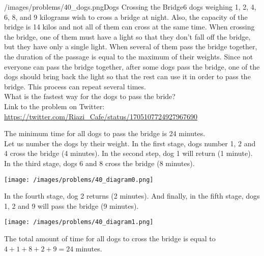 \begin{problem}{/images/problems/40_dogs.png}{Dogs Crossing the Bridge}6 dogs weighing 1, 2, 4, 6, 8, and 9 kilograms wish to cross a bridge at night. Also, the capacity of the bridge is 14 kilos and not all of them can cross at the same time. When crossing the bridge, one of them must have a light so that they don't fall off the bridge, but they have only a single light. When several of them pass the bridge together, the duration of the passage is equal to the maximum of their weights. Since not everyone can pass the bridge together, after some  dogs pass the bridge, one of the dogs should bring back the light so that the rest can use it in order to pass the bridge. This process can repeat several times.\\[0.2cm]

What is the fastest way for the dogs to pass the bride?\\[0.2cm]

Link to the problem on Twitter:  \url{https://twitter.com/Riazi_Cafe/status/1705107724927967690}\end{problem}
\begin{solution}
The minimum time  for all dogs to pass the bridge is 24 minutes.\\[0.2cm]

Let us number the dogs by their weight. In the first stage, dogs number 1, 2 and 4 cross the bridge (4 minutes). In the second step, dog 1 will return (1 minute). In the third stage, dogs 6 and 8 cross the bridge (8 minutes).
\begin{center}
	\texttt{[image: /images/problems/40\_diagram0.png]}
\end{center}

In the fourth stage, dog 2 returns (2 minutes). And finally, in the fifth stage, dogs 1, 2 and 9 will pass the bridge (9 minutes).

\begin{center}
	\texttt{[image: /images/problems/40\_diagram1.png]}
\end{center}

The total amount of time for all dogs to cross the bridge is equal to $4+1+8+2+9 = 24$ minutes.
\end{solution}
